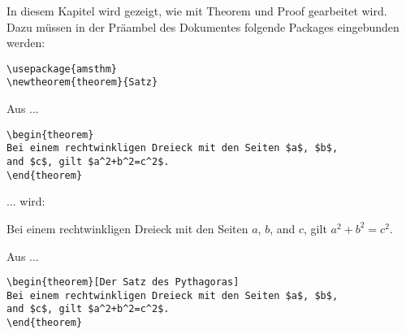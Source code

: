In diesem Kapitel wird gezeigt, wie mit Theorem und Proof gearbeitet wird. Dazu müssen in der Präambel des Dokumentes folgende Packages eingebunden werden:

\begin{tcolorbox}[width=\textwidth,colback={light-gray},title={Latex-Text},colbacktitle=gray,coltitle=white]

\begin{verbatim}
\usepackage{amsthm}
\newtheorem{theorem}{Satz}
\end{verbatim}

\end{tcolorbox}

\par\bigskip 
\par\bigskip 
Aus ...

\begin{tcolorbox}[width=\textwidth,colback={light-gray},title={Latex-Text},colbacktitle=gray,coltitle=white]

\begin{verbatim}
\begin{theorem}
Bei einem rechtwinkligen Dreieck mit den Seiten $a$, $b$, 
and $c$, gilt $a^2+b^2=c^2$. 
\end{theorem} 
\end{verbatim}

\end{tcolorbox}

... wird:

\begin{tcolorbox}[width=\textwidth,colback={light-gray},title={Print-Text},colbacktitle=gray,coltitle=white]

\begin{theorem}
Bei einem rechtwinkligen Dreieck mit den Seiten $a$, $b$, 
and $c$, gilt $a^2+b^2=c^2$. 
\end{theorem} 

\end{tcolorbox}


\par\bigskip 
\par\bigskip 
\par\bigskip 
Aus ...

\begin{tcolorbox}[width=\textwidth,colback={light-gray},title={Latex-Text},colbacktitle=gray,coltitle=white]

\begin{verbatim}
\begin{theorem}[Der Satz des Pythagoras] 
Bei einem rechtwinkligen Dreieck mit den Seiten $a$, $b$, 
and $c$, gilt $a^2+b^2=c^2$.
\end{theorem}
\end{verbatim}

\end{tcolorbox}

